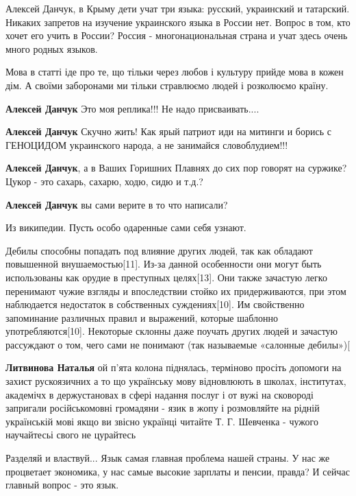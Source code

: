 \begin{itemize}
{\begin{itemize}

Алексей Данчук, в Крыму дети учат три языка: русский, украинский и татарский.
Никаких запретов на изучение украинского языка в России нет. Вопрос в том, кто
хочет его учить в России? Россия - многонациональная страна и учат здесь очень
много родных языков.

Мова в статті іде про те, що тільки через любов і культуру прийде мова в кожен
дім. А своїми заборонами ми тільки стравлюємо людей і розколюємо країну.

\textbf{Алексей Данчук} Это моя реплика!!! Не надо присваивать....

\textbf{Алексей Данчук} Скучно жить! Как ярый патриот иди на митинги и борись с
ГЕНОЦИДОМ украинского народа, а не занимайся словоблудием!!!

\textbf{Алексей Данчук}, а в Ваших Горишних Плавнях до сих пор говорят на
суржике? Цукор - это сахарь, сахарю, ходю, сидю и т.д.?


\textbf{Алексей Данчук} вы сами верите в то что написали?

Из википедии. Пусть особо одаренные сами себя узнают.

Дебилы способны попадать под влияние других людей, так как обладают повышенной
внушаемостью[11]. Из-за данной особенности они могут быть использованы как
орудие в преступных целях[13]. Они также зачастую легко перенимают чужие
взгляды и впоследствии стойко их придерживаются, при этом наблюдается
недостаток в собственных суждениях[10]. Им свойственно запоминание различных
правил и выражений, которые шаблонно употребляются[10]. Некоторые склонны даже
поучать других людей и зачастую рассуждают о том, чего сами не понимают (так
называемые «салонные дебилы»)[

\textbf{Литвинова Наталья} ой п'ята колона піднялась, терміново просіть
допомоги на захист рускоязичних а то що українську мову відновлюють в школах,
інститутах, академічх в держустановах в сфері надання послуг і от вужі на
сковороді запригали російськомовні громадяни - язик в жопу і розмовляйте на
рідній українській мові якщо ви звісно українці читайте Т. Г. Шевченка - чужого
научайтесьі свого не цурайтесь

\end{itemize}


Разделяй и властвуй... Язык самая главная проблема нашей страны. У нас же
процветает экономика, у нас самые высокие зарплаты и пенсии, правда? И сейчас
главный вопрос - это язык.

}
\end{itemize}
